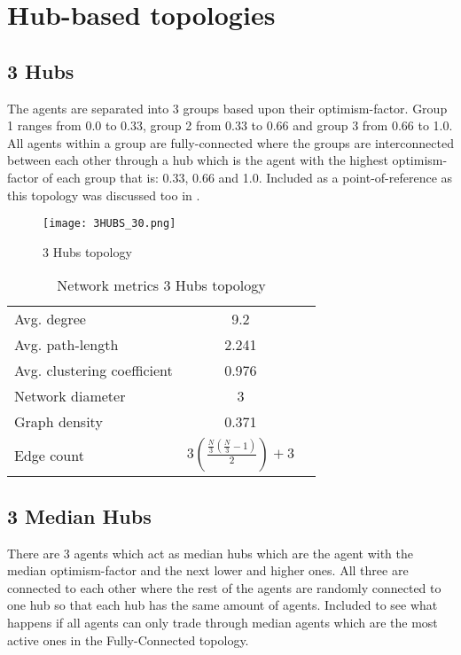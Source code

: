 \documentclass[Bachelorarbeit.tex]{subfiles}
\begin{document}
\section{Hub-based topologies}
\subsection{3 Hubs}
The agents are separated into 3 groups based upon their optimism-factor. Group 1 ranges from 0.0 to 0.33, group 2 from 0.33 to 0.66 and group 3 from 0.66 to 1.0. All agents within a group are fully-connected where the groups are interconnected between each other through a hub which is the agent with the highest optimism-factor of each group that is: 0.33, 0.66 and 1.0.
\medskip
Included as a point-of-reference as this topology was discussed too in \cite{Breuer2015}.

\begin{figure}[H]
	\centering
  \texttt{[image: 3HUBS\_30.png]}
	\caption{3 Hubs topology}
	\label{fig:topology_3HUBS_30}
\end{figure}

\begin{table}[h]
	\centering
	\caption{Network metrics 3 Hubs topology}
	\begin{tabular} { l c r }
		\hline
		Avg. degree & 9.2 \\
		Avg. path-length & 2.241 \\
		Avg. clustering coefficient & 0.976 \\
		Network diameter & 3 \\
		Graph density & 0.371\\
		Edge count & $3(\frac{\frac{N}{3}(\frac{N}{3} - 1)}{2}) + 3$ \\
		\hline
	\end{tabular}
\end{table}

\subsection{3 Median Hubs}
There are 3 agents which act as median hubs which are the agent with the median optimism-factor and the next lower and higher ones. All three are connected to each other where the rest of the agents are randomly connected to one hub so that each hub has the same amount of agents.
\medskip
Included to see what happens if all agents can only trade through median agents which are the most active ones in the Fully-Connected topology.
\end{document}
